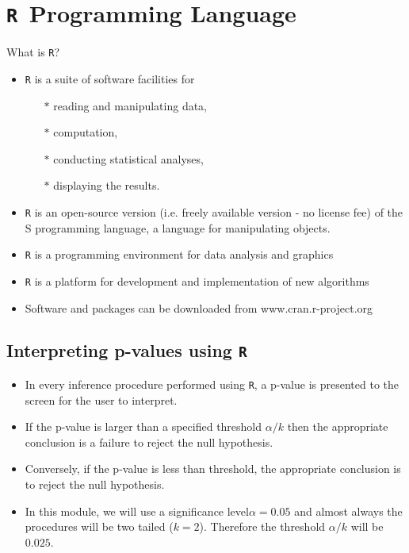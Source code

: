 \documentclass[a4paper,12pt]{article}
\begin{document}
\section*{\texttt{R }Programming Language}
	What is \texttt{R}?
	
	\begin{itemize}
		\item \texttt{R} is a suite of software facilities for
		\begin{itemize}
			\item[$\ast$] reading and manipulating data,
			\item[$\ast$] computation,
			\item[$\ast$] conducting statistical analyses,
			\item[$\ast$] displaying the results.
		\end{itemize}
		\item \texttt{R} is an open-source version (i.e. freely available version - no license
		fee) of the S programming language, a language for
		manipulating objects.
		
		\item \texttt{R} is a programming environment for data analysis and graphics
		\item \texttt{R} is a platform for development and implementation of new
		algorithms
		\item Software and packages can be downloaded from
		www.cran.r-project.org
	\end{itemize}
	
	
\subsection*{Interpreting p-values using \texttt{R}}
	\begin{itemize}
		\item In every inference procedure performed using \texttt{R}, a p-value is presented to the screen for the user to interpret.
		
		\item If the p-value is larger than a specified threshold $\alpha/k$ then the appropriate conclusion is a
		failure to reject the null hypothesis.
		
		\item Conversely, if the p-value is less than threshold, the appropriate conclusion is to reject the null hypothesis.
		
		\item In this module, we will use a significance level$\alpha=0.05$ and almost always the procedures will be two tailed ($k=2$). Therefore the threshold $\alpha/k$ will be $0.025$.
	\end{itemize}
\end{document}
